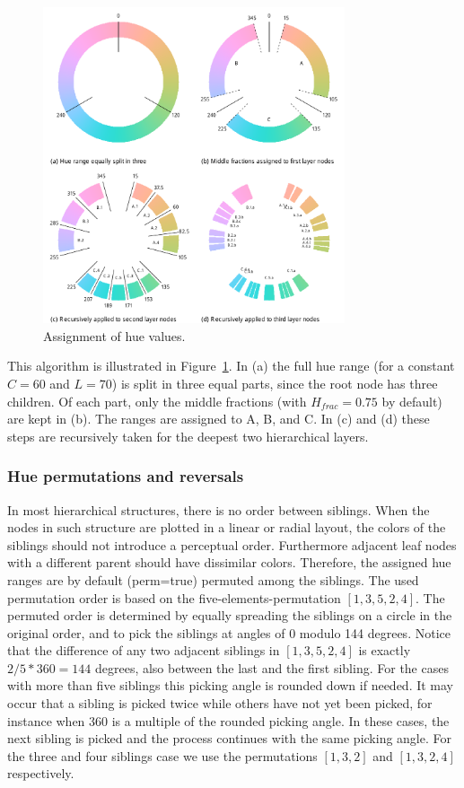 \documentclass[journal]{vgtc}                %
\begin{document}
\begin{figure}[tb]
  \centering
  \includegraphics[width=3.5in]{hcl_method2.pdf}
  \caption{Assignment of hue values.}\label{fig:wheel}
\end{figure}

This algorithm is illustrated in Figure~\ref{fig:wheel}. In (a) the full hue range (for a constant $C=60$ and $L=70$)  is split in three equal parts, since the root node has three children. Of each part, only the middle fractions (with $H_{frac}=0.75$ by default) are kept in (b). The ranges are assigned to A, B, and C. In (c) and (d) these steps are recursively taken for the deepest two hierarchical layers.

\subsubsection{Hue permutations and reversals}

In most hierarchical structures, there is no order between siblings. 
When the nodes in such structure are plotted in a linear or radial layout, 
the colors of the siblings should not introduce a perceptual order. Furthermore adjacent leaf nodes with a different parent should have dissimilar colors. Therefore, the assigned hue 
ranges are by default (\textsf{perm=true}) permuted among the siblings. The used permutation order is based on the five-elements-permutation $[1, 3, 5, 2, 4]$. The permuted order is determined by equally spreading the siblings on a circle in the original order, and to pick the siblings at angles of 0 modulo 144 degrees. Notice that the difference of any two adjacent siblings in $[1, 3, 5, 2, 4]$ is exactly $2/5 * 360=144$ degrees, also between the last and the first sibling. For the cases with more than five siblings this picking angle is rounded down if needed. It may occur that a sibling is picked twice while others have not yet been picked, for instance when 360 is a multiple of the rounded picking angle. In these cases, the next sibling is picked and the process continues with the same picking angle. For the three and four siblings case we use the permutations $[1, 3, 2]$ and $[1, 3, 2, 4]$ respectively. 
\end{document}
